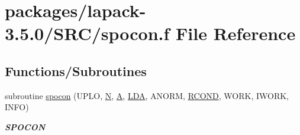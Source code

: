 \hypertarget{spocon_8f}{}\section{packages/lapack-\/3.5.0/\+S\+R\+C/spocon.f File Reference}
\label{spocon_8f}
\subsection*{Functions/\+Subroutines}
\begin{DoxyCompactItemize}
\item 
subroutine \hyperlink{group__realPOcomputational_gaca094dd6ef3db9ecb580ea731ecb5365}{spocon} (U\+P\+L\+O, \hyperlink{polmisc_8c_a0240ac851181b84ac374872dc5434ee4}{N}, \hyperlink{classA}{A}, \hyperlink{example__user_8c_ae946da542ce0db94dced19b2ecefd1aa}{L\+D\+A}, A\+N\+O\+R\+M, \hyperlink{superlu__enum__consts_8h_af00a42ecad444bbda75cde1b64bd7e72a9b5c151728d8512307565994c89919d5}{R\+C\+O\+N\+D}, W\+O\+R\+K, I\+W\+O\+R\+K, I\+N\+F\+O)
\begin{DoxyCompactList}\small\item\em {\bfseries S\+P\+O\+C\+O\+N} \end{DoxyCompactList}\end{DoxyCompactItemize}
